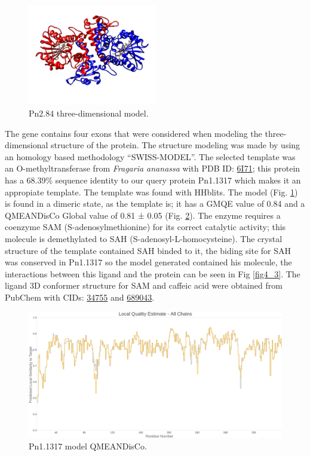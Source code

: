 \documentclass[12pt]{article}
\begin{document}
	
	\FloatBarrier
	\begin{figure}
		\centering
		\includegraphics[width=0.5\textwidth]{../4/Swiss/model2.png}
		\caption{Pn2.84 three-dimensional model.}
		\label{fig4_1}
	\end{figure}
	\FloatBarrier
	
	The gene contains four exons that were considered when modeling the three-dimensional structure of the protein. The structure modeling was made by using an homology based methodology ``SWISS-MODEL''. \cite{swiss} The selected template was an O-methyltransferase from \textit{Fragaria ananassa} with PDB ID: \href{https://www.rcsb.org/structure/6I71}{6I71}; this protein has a 68.39\% sequence identity to our query protein Pn1.1317 which makes it an appropiate template. The template was found with HHblits. \cite{hhblits} The model (Fig. \ref{fig4_1}) is found in a dimeric state, as the template is; it has a GMQE value of 0.84 and a QMEANDisCo Global value of 0.81 ± 0.05 (Fig. \ref{fig4_2}). \cite{qmeandisco_swiss}	The enzyme requires a coenzyme SAM (S-adenosylmethionine) for its correct catalytic activity; this molecule is demethylated to SAH (S-adenosyl-L-homocysteine). The crystal structure of the template contained SAH binded to it, the biding site for SAH was conserved in Pn1.1317 so the model generated contained his molecule, the interactions between this ligand and the protein can be seen in Fig \ref{fig4_3}. The ligand 3D conformer structure for SAM and caffeic acid were obtained from PubChem with CIDs: \href{https://pubchem.ncbi.nlm.nih.gov/compound/34755}{34755} and \href{https://pubchem.ncbi.nlm.nih.gov/compound/689043}{689043}.
	
	\FloatBarrier
	\begin{figure}[h!]
		\centering
		\includegraphics[width=\textwidth-50pt]{../4/Swiss/Local_quality_estimate.png}
		\caption{Pn1.1317 model QMEANDisCo.}
		\label{fig4_2}
	\end{figure}
	\FloatBarrier
	
\end{document}
